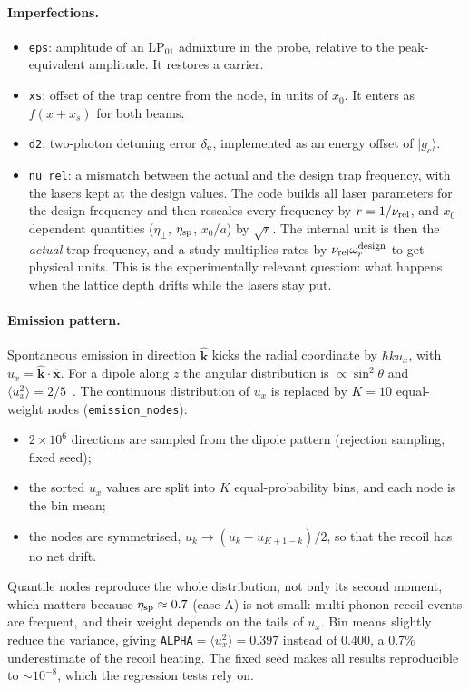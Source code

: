 \documentclass[11pt,a4paper]{article}
\newcommand{\ket}[1]{|#1\rangle}
\newcommand{\gc}{\ket{g_c}}
\newcommand{\etap}{\eta_\perp}
\newcommand{\code}[1]{\texttt{#1}}
\begin{document}
\paragraph{Imperfections.}
\begin{itemize}
\item \code{eps}: amplitude of an LP$_{01}$ admixture in the probe, relative to the peak-equivalent amplitude. It restores a carrier.
\item \code{xs}: offset of the trap centre from the node, in units of $x_0$. It enters as $f(x+x_s)$ for both beams.
\item \code{d2}: two-photon detuning error $\delta_{\rm e}$, implemented as an energy offset of $\gc$.
\item \code{nu\_rel}: a mismatch between the actual and the design trap frequency, with the lasers kept at the design values. The code builds all laser parameters for the design frequency and then rescales every frequency by $r=1/\nu_{\rm rel}$, and $x_0$-dependent quantities ($\etap$, $\eta_{\rm sp}$, $x_0/a$) by $\sqrt r$. The internal unit is then the \emph{actual} trap frequency, and a study multiplies rates by $\nu_{\rm rel}\omega_r^{\rm design}$ to get physical units. This is the experimentally relevant question: what happens when the lattice depth drifts while the lasers stay put.
\end{itemize}

\paragraph{Emission pattern.} Spontaneous emission in direction $\hat{\mathbf k}$ kicks the radial coordinate by $\hbar k u_x$, with $u_x=\hat{\mathbf k}\cdot\hat{\mathbf x}$. For a dipole along $z$ the angular distribution is $\propto\sin^2\theta$ and $\langle u_x^2\rangle=2/5$~\cite{cirac1992}. The continuous distribution of $u_x$ is replaced by $K=10$ equal-weight nodes (\code{emission\_nodes}):
\begin{itemize}
\item $2\times10^6$ directions are sampled from the dipole pattern (rejection sampling, fixed seed);
\item the sorted $u_x$ values are split into $K$ equal-probability bins, and each node is the bin mean;
\item the nodes are symmetrised, $u_k\to(u_k-u_{K+1-k})/2$, so that the recoil has no net drift.
\end{itemize}
Quantile nodes reproduce the whole distribution, not only its second moment, which matters because $\eta_{\rm sp}\approx0.7$ (case A) is not small: multi-phonon recoil events are frequent, and their weight depends on the tails of $u_x$. Bin means slightly reduce the variance, giving \code{ALPHA}$=\langle u_x^2\rangle=0.397$ instead of 0.400, a 0.7\% underestimate of the recoil heating. The fixed seed makes all results reproducible to $\sim10^{-8}$, which the regression tests rely on.
\end{document}
